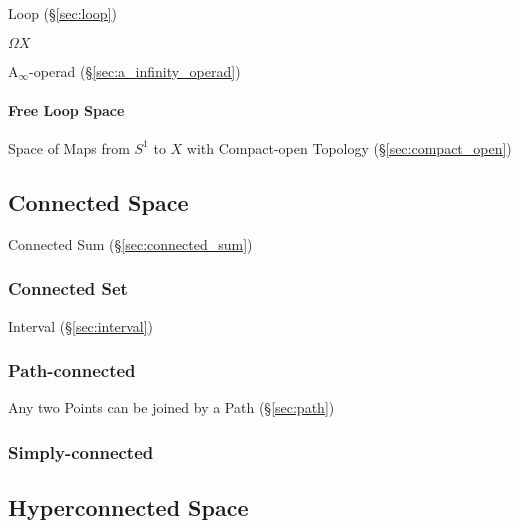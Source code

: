 Loop (\S\ref{sec:loop})

$\Omega X$

A$_\infty$-operad (\S\ref{sec:a_infinity_operad})



\paragraph{Free Loop Space}\label{sec:free_loop_space}\hfill

Space of Maps from $S^1$ to $X$ with Compact-open Topology
(\S\ref{sec:compact_open})



\subsection{Connected Space}\label{sec:connected_space}

\fist Connected Sum (\S\ref{sec:connected_sum})



\subsubsection{Connected Set}\label{sec:connected_set}

Interval (\S\ref{sec:interval})



\subsubsection{Path-connected}\label{sec:path_connected}

Any two Points can be joined by a Path (\S\ref{sec:path})



\subsubsection{Simply-connected}\label{sec:simply_connected}



\subsection{Hyperconnected Space}\label{sec:hyperconnected_space}

